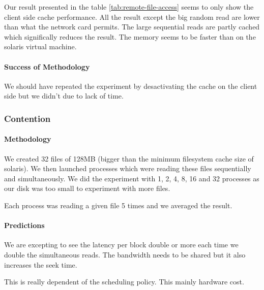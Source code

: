 Our result presented in the table \ref{tab:remote-file-access} seems to only
show the client side cache performance.
All the result except the big random read are lower than what the network card
permits.
The large sequential reads are partly cached which significally reduces the
result.
The memory seems to be faster than on the solaris virtual machine.

\paragraph{Success of Methodology}
We should have repeated the experiment by desactivating the cache on the client
side but we didn't due to lack of time.

\subsubsection{Contention}

\paragraph{Methodology}
We created 32 files of 128MB (bigger than the minimum filesystem cache size of
solaris).
We then launched processes which were reading these files sequentially and
simultaneously.
We did the experiment with 1, 2, 4, 8, 16 and 32 processes as our disk was too
small to experiment with more files.

Each process was reading a given file 5 times and we averaged the result.

\paragraph{Predictions}
We are excepting to see the latency per block double or more each time we double
the simultaneous reads.
The bandwidth needs to be shared but it also increases the seek time.

This is really dependent of the scheduling policy.
This mainly hardware cost.

